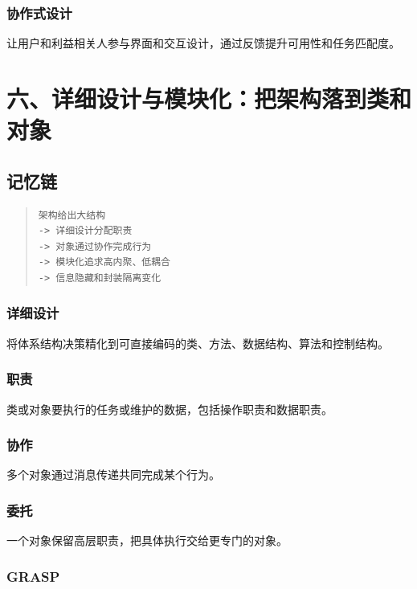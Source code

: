 \documentclass[UTF8,zihao=-4]{ctexart}
\begin{document}
\subsubsection*{协作式设计}


让用户和利益相关人参与界面和交互设计，通过反馈提升可用性和任务匹配度。


\section{六、详细设计与模块化：把架构落到类和对象}


\subsection{记忆链}


\begin{quote}
\footnotesize
\begin{verbatim}
架构给出大结构
-> 详细设计分配职责
-> 对象通过协作完成行为
-> 模块化追求高内聚、低耦合
-> 信息隐藏和封装隔离变化
\end{verbatim}
\end{quote}


\subsubsection*{详细设计}


将体系结构决策精化到可直接编码的类、方法、数据结构、算法和控制结构。


\subsubsection*{职责}


类或对象要执行的任务或维护的数据，包括操作职责和数据职责。


\subsubsection*{协作}


多个对象通过消息传递共同完成某个行为。


\subsubsection*{委托}


一个对象保留高层职责，把具体执行交给更专门的对象。


\subsubsection*{GRASP}
\end{document}
